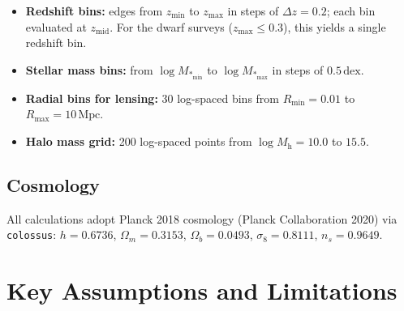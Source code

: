 \documentclass[12pt, letterpaper]{article}
\newcommand{\Mh}{M_\mathrm{h}}
\newcommand{\Mstar}{M_*}
\begin{document}
\begin{itemize}
    \item \textbf{Redshift bins:} edges from $z_\mathrm{min}$ to
    $z_\mathrm{max}$ in steps of $\Delta z = 0.2$; each bin evaluated
    at $z_\mathrm{mid}$.
    For the dwarf surveys ($z_\mathrm{max} \le 0.3$), this yields a
    single redshift bin.
    \item \textbf{Stellar mass bins:} from $\log\Mstar_\mathrm{min}$
    to $\log\Mstar_\mathrm{max}$ in steps of $0.5\,\mathrm{dex}$.
    \item \textbf{Radial bins for lensing:} 30 log-spaced bins from
    $R_\mathrm{min} = 0.01$ to $R_\mathrm{max} = 10\,\mathrm{Mpc}$.
    \item \textbf{Halo mass grid:} 200 log-spaced points from
    $\log\Mh = 10.0$ to $15.5$.
\end{itemize}


\subsection{Cosmology}

All calculations adopt Planck 2018 cosmology (Planck Collaboration
2020) via \texttt{colossus}:
$h = 0.6736$, $\Omega_m = 0.3153$, $\Omega_b = 0.0493$,
$\sigma_8 = 0.8111$, $n_s = 0.9649$.


\section{Key Assumptions and Limitations}
\label{sec:limitations}
\end{document}
